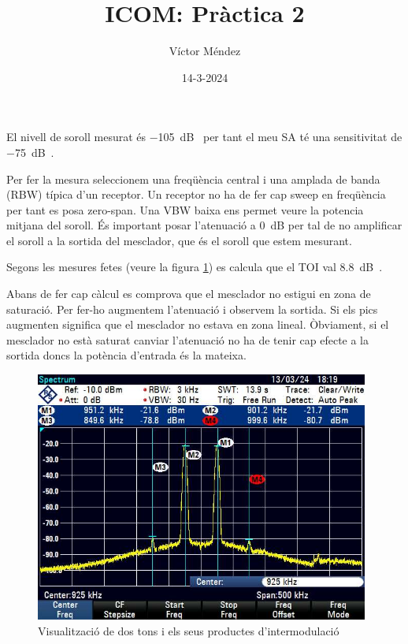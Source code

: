 \documentclass[catalan, a4paper, nobib]{tufte-handout}
\author{Víctor Méndez}
\title{ICOM: Pràctica 2}
\date{14-3-2024}
\begin{document}
\maketitle


El nivell de soroll mesurat és \qty[qualifier-mode = combine]{-105}{\deci\bel{}} per tant el meu SA té una sensitivitat de \qty[qualifier-mode = combine]{-75}{\deci\bel{}}.

Per fer la mesura seleccionem una freqüència central i una amplada de banda (RBW) típica d'un receptor. Un receptor no ha de fer cap sweep en freqüència per tant es posa zero-span. Una VBW baixa ens permet veure la potencia mitjana del soroll. És important posar l'atenuació a \qty{0}{\deci\bel} per tal de no amplificar el soroll a la sortida del mesclador, que és el soroll que estem mesurant.


Segons les mesures fetes (veure la figura \ref{fig:p2}) es calcula que el TOI val \qty[qualifier-mode = combine]{8.8}{\deci\bel{}}.


Abans de fer cap càlcul es comprova que el mesclador no estigui en zona de saturació. Per fer-ho augmentem l'atenuació i observem la sortida. Si els pics augmenten significa que el mesclador no estava en zona lineal. Òbviament, si el mesclador no està saturat canviar l'atenuació no ha de tenir cap efecte a la sortida doncs la potència d'entrada és la mateixa.

\begin{figure}[h]
    \begin{center}
        \includegraphics[width=415px]{p2.png}
    \end{center}
    \caption{Visualització de dos tons i els seus productes d'intermodulació}
    \label{fig:p2}
\end{figure}
\end{document}
